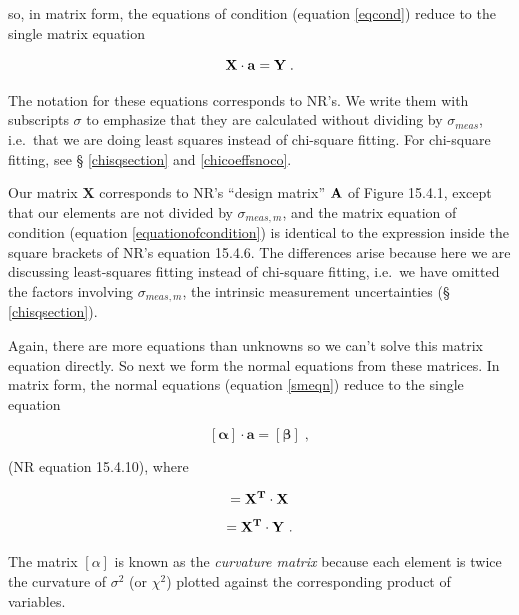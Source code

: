 \documentclass[psfig,preprint]{aastex}
\begin{document}
\noindent so, in matrix form, the equations of condition (equation
\ref{eqcond}) reduce to the single matrix equation

\begin{equation}
\label{equationofcondition}
{\bf X \cdot a} = {\bf Y} \; .
\end{equation}

\noindent The notation for these equations corresponds to NR's. We write
them with subscripts $\sigma$ to emphasize that they are calculated
without dividing by $\sigma_{meas}$, i.e.\ that we are doing least
squares instead of chi-square fitting. For chi-square fitting, see \S
\ref{chisqsection} and \ref{chicoeffsnoco}.

	Our matrix $\mathbf{X}$ corresponds to NR's ``design
matrix'' $\bf A$ of Figure 15.4.1, except that our elements are not
divided by $\sigma_{meas,m}$, and the matrix equation of condition
(equation \ref{equationofcondition}) is identical to the expression
inside the square brackets of NR's equation 15.4.6. The differences
arise because here we are discussing least-squares fitting instead of
chi-square fitting, i.e.\ we have omitted the factors involving
$\sigma_{meas,m}$, the intrinsic measurement uncertainties (\S
\ref{chisqsection}).

	Again, there are more equations than unknowns so we can't solve
this matrix equation directly.  So next we form the normal equations
from these matrices.  In matrix form, the normal equations (equation
\ref{smeqn}) reduce to the single equation 

\begin{equation} \label{matrixnormal}
\mathbf{[\alpha] \cdot a} = \mathbf{[\beta]} \; ,
\end{equation}

\noindent (NR equation 15.4.10), where

\begin{mathletters} 
\label{ssdef}
\begin{equation} 
[\alpha] = {\bf X^T \cdot X} 
\end{equation}
\begin{equation}
[\beta] = {\bf X^T \cdot Y} \ .
\end{equation}
\end{mathletters}

\noindent The matrix $[\alpha]$ is known as the {\it curvature
matrix} because each element is twice the curvature of $\sigma^2$ (or
$\chi^2$) plotted against the corresponding product of variables. 
\end{document}
